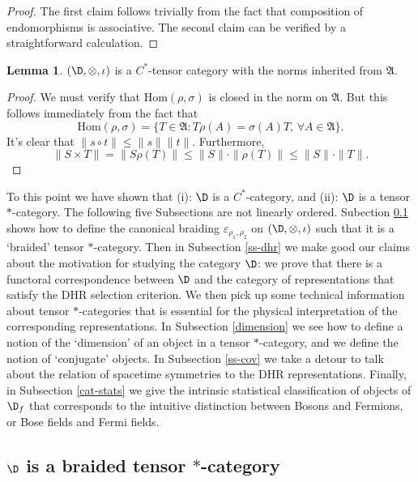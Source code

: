 \documentclass[11pt]{article}
\newcommand{\alg}[1]{\mathfrak{#1}}
\newcommand{\norm}[1]{\| #1\|}
\theoremstyle{definition}
\newtheorem{lemma}[thm]{Lemma}
\theoremstyle{definition}
\theoremstyle{remark}
\newcommand{\ve}{\varepsilon}
\newcommand{\Hom}{\mathrm{Hom}}
\begin{document}
\begin{proof} The first claim follows trivially from the fact that composition of
  endomorphisms is associative.  The second claim can be verified by a
  straightforward calculation.  \end{proof}


\begin{lemma} $(\D ,\otimes ,\iota )$ is a $C^*$-tensor category with the norms
  inherited from $\alg{A}$. \end{lemma}

\begin{proof} We must verify that $\Hom (\rho ,\sigma )$ is closed in the norm on
  $\alg{A}$.  But this follows immediately from the fact that 
$$ \Hom (\rho ,\sigma )= \{ T\in \alg{A}:T\rho (A)=\sigma (A)T ,\, \forall A\in
\alg{A} \} .$$ 
It's clear that $\norm{s\circ t}\leq \norm{s}\norm{t}$.  Furthermore,
$$ \norm{S\times T}=\norm{S\rho (T)}\leq \norm{S}\cdot \norm{\rho (T)}\leq
\norm{S}\cdot \norm{T} .$$
\end{proof}

To this point we have shown that (i): $\D$ is a $C^*$-category, and
(ii): $\D$ is a tensor $*$-category.  The following five Subsections
are not linearly ordered.  Subection \ref{braided} shows how to define
the canonical braiding $\ve _{\rho _1,\rho _2}$ on $(\D ,\otimes
,\iota )$ such that it is a `braided' tensor $*$-category.  Then in
Subsection \ref{ss-dhr} we make good our claims about the motivation
for studying the category $\D$: we prove that there is a functoral
correspondence between $\D$ and the category of representations that
satisfy the DHR selection criterion.  We then pick up some technical
information about tensor $*$-categories that is essential for the
physical interpretation of the corresponding representations.  In
Subsection \ref{dimension} we see how to define a notion of the
`dimension' of an object in a tensor $*$-category, and we define the
notion of `conjugate' objects.  In Subsection \ref{ss-cov} we take a
detour to talk about the relation of spacetime symmetries to the DHR
representations.  Finally, in Subsection \ref{cat-stats} we give the
intrinsic statistical classification of objects of $\D _f$ that
corresponds to the intuitive distinction between Bosons and Fermions,
or Bose fields and Fermi fields.



\subsection{$\D$ is a braided tensor $*$-category}
\label{braided}
\end{document}
